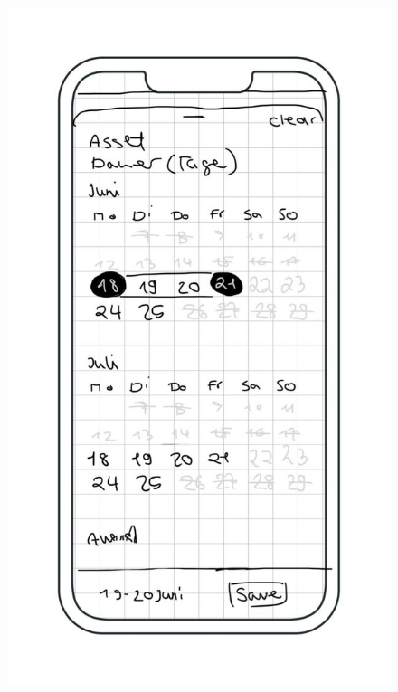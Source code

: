 \begin{figure}[h]
    \centering
    \includegraphics[scale=0.4]{Bilder/Mockups/Kalender.jpg}\hspace{2em}

\end{figure}
